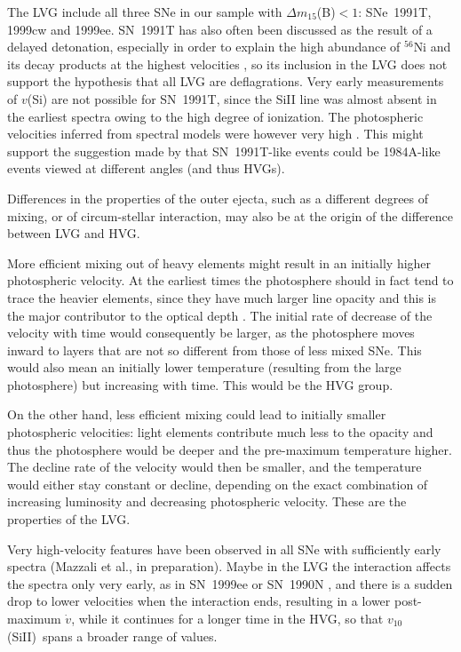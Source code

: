 \documentclass[preprint2]{aastex}
\newcommand{\dm}{$\Delta m_{15}$(B)}
\newcommand{\vSiiX}{$v_{10}$(SiII)}
\begin{document}
The LVG include all three SNe in our sample with \dm$ < 1$:
SNe~1991T, 1999cw and 1999ee. SN~1991T has also often been discussed
as the result of a delayed detonation, especially in order to explain
the high abundance of $^{56}$Ni and its decay products at the highest
velocities \citep{maz95}, so its inclusion in the LVG does not support
the hypothesis that all LVG are deflagrations. Very early measurements
of $v$(Si) are not possible for SN~1991T, since the SiII line was almost 
absent in the earliest spectra owing to the high degree of ionization.
The photospheric velocities inferred from spectral models were however 
very high \citep{maz95}. This might support the suggestion made by 
\citet{wan04} that SN~1991T-like events could be 1984A-like events 
viewed at different angles (and thus HVGs). 

Differences in the properties of the outer ejecta, such as a different
degrees of mixing, or of circum-stellar interaction, may also be at
the origin of the difference between LVG and HVG.

More efficient mixing out of heavy elements might result in an
initially higher photospheric velocity. At the earliest times the
photosphere should in fact tend to trace the heavier elements, since
they have much larger line opacity and this is the major contributor
to the optical depth \citep{paul96}. The initial rate of decrease of
the velocity with time would consequently be larger, as the
photosphere moves inward to layers that are not so different
from those of less mixed SNe. This would also mean an initially
lower temperature (resulting from the large photosphere) but
increasing with time. This would be the HVG group.

On the other hand, less efficient mixing could lead to initially
smaller photospheric velocities: light elements contribute much less
to the opacity and thus the photosphere would be deeper and the
pre-maximum temperature higher. The decline rate of the velocity would
then be smaller, and the temperature would either stay constant or
decline, depending on the exact combination of increasing luminosity
and decreasing photospheric velocity. These are the properties of the
LVG.

Very high-velocity features have been observed in all SNe with sufficiently
early spectra (Mazzali et al., in preparation). Maybe in the LVG the
interaction affects the spectra only very early, as in SN~1999ee
\citep{maz05} or SN~1990N \citep{fish97,maz01}, and there is a sudden
drop to lower velocities when the interaction ends, resulting in a
lower post-maximum $\dot{v}$, while it continues for a longer time in
the HVG, so that \vSiiX\ spans a broader range of values.
\end{document}

